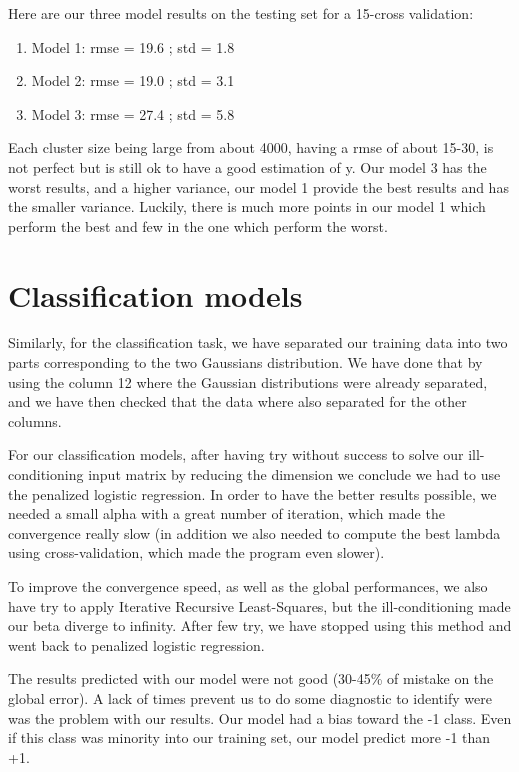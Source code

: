 \documentclass{article} %
\begin{document}
Here are our three model results on the testing set for a 15-cross validation:
\begin{enumerate}  
        \item Model 1:  rmse = 19.6      ; std = 1.8
        \item Model 2:  rmse = 19.0      ; std = 3.1
        \item Model 3:  rmse = 27.4      ; std = 5.8
\end{enumerate}

Each cluster size being large from about 4000, having a rmse of about 15-30, is not perfect but is still ok to have a good estimation of y. Our model 3 has the worst results, and a higher variance, our model 1 provide the best results and has the smaller variance. Luckily, there is much more points in our model 1 which perform the best and few in the one which perform the worst.

\section{Classification models}

Similarly, for the classification task,  we have separated our training data into two parts corresponding to the two Gaussians distribution. We have done that by using the column 12 where the Gaussian distributions were already separated, and we have then checked that the data where also separated for the other columns.

For our classification models, after having try without success to solve our ill-conditioning input matrix by reducing the dimension we conclude we had to use the penalized logistic regression. In order to have the better results possible, we needed a small alpha with a great number of iteration, which made the convergence really slow (in addition we also needed to compute the best lambda using cross-validation, which made the program even slower).

To improve the convergence speed, as well as the global performances, we also have try to apply Iterative Recursive Least-Squares, but the ill-conditioning made our beta diverge to infinity. After few try, we have stopped using this method and went back to penalized logistic regression.

The results predicted with our model were not good (30-45\% of mistake on the global error). A lack of times prevent us to do some diagnostic to identify were was the problem with our results. Our model had a bias toward the -1 class. Even if this class was minority into our training set, our model predict more -1 than +1.
\end{document}
